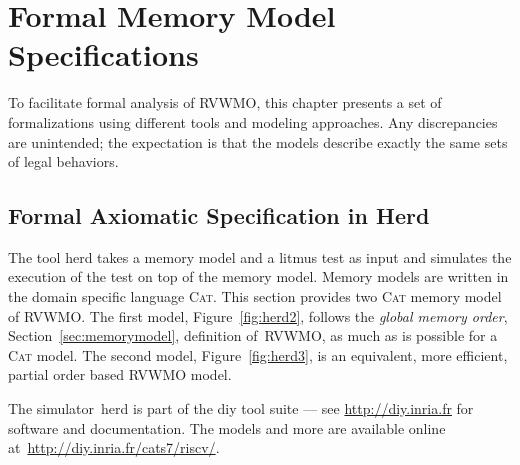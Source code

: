 \chapter{Formal Memory Model Specifications}

To facilitate formal analysis of RVWMO, this chapter presents a set of formalizations using different tools and modeling approaches.  Any discrepancies are unintended; the expectation is that the models describe exactly the same sets of legal behaviors.

\clearpage


\clearpage
\section{Formal Axiomatic Specification in Herd}

The tool \textsf{herd} takes a memory model and a litmus test as input and simulates the execution of the test on top of the memory model. Memory models are written in the domain specific language \textsc{Cat}. This section provides two \textsc{Cat} memory model of RVWMO. The first model, Figure~\ref{fig:herd2}, follows the \emph{global memory order}, Section~\ref{sec:memorymodel}, definition of~RVWMO, as much as is possible for a \textsc{Cat} model. The second model, Figure~\ref{fig:herd3}, is an equivalent, more efficient, partial order based RVWMO model.

The simulator~\textsf{herd} is part of the \textsf{diy} tool suite --- see \url{http://diy.inria.fr} for software and documentation. The models and more are available online at~\url{http://diy.inria.fr/cats7/riscv/}.

